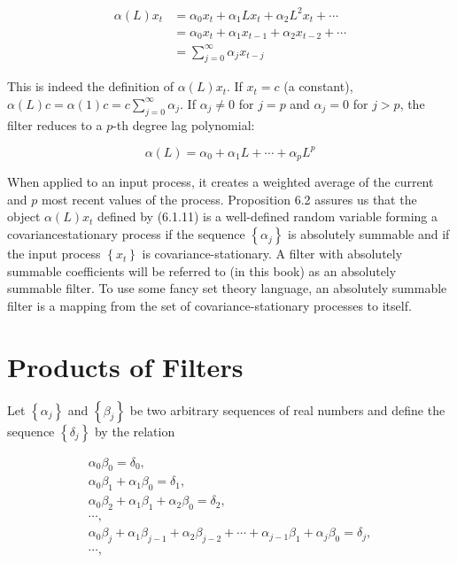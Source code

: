 \documentclass[10pt]{article}
\begin{document}
\begin{align*}
\alpha(L) x_{t} & =\alpha_{0} x_{t}+\alpha_{1} L x_{t}+\alpha_{2} L^{2} x_{t}+\cdots \\
& =\alpha_{0} x_{t}+\alpha_{1} x_{t-1}+\alpha_{2} x_{t-2}+\cdots \\
& =\sum_{j=0}^{\infty} \alpha_{j} x_{t-j} \tag{6.1.11}
\end{align*}


This is indeed the definition of $\alpha(L) x_{t}$. If $x_{t}=c$ (a constant), $\alpha(L) c=\alpha(1) c= c \sum_{j=0}^{\infty} \alpha_{j}$. If $\alpha_{j} \neq 0$ for $j=p$ and $\alpha_{j}=0$ for $j>p$, the filter reduces to a $p$-th degree lag polynomial:

$$
\alpha(L)=\alpha_{0}+\alpha_{1} L+\cdots+\alpha_{p} L^{p}
$$

When applied to an input process, it creates a weighted average of the current and $p$ most recent values of the process. Proposition 6.2 assures us that the object $\alpha(L) x_{t}$ defined by (6.1.11) is a well-defined random variable forming a covariancestationary process if the sequence $\left\{\alpha_{j}\right\}$ is absolutely summable and if the input process $\left\{x_{t}\right\}$ is covariance-stationary. A filter with absolutely summable coefficients will be referred to (in this book) as an absolutely summable filter. To use some fancy set theory language, an absolutely summable filter is a mapping from the set of covariance-stationary processes to itself.

\section*{Products of Filters}
Let $\left\{\alpha_{j}\right\}$ and $\left\{\beta_{j}\right\}$ be two arbitrary sequences of real numbers and define the sequence $\left\{\delta_{j}\right\}$ by the relation


\begin{gather*}
\alpha_{0} \beta_{0}=\delta_{0}, \\
\alpha_{0} \beta_{1}+\alpha_{1} \beta_{0}=\delta_{1}, \\
\alpha_{0} \beta_{2}+\alpha_{1} \beta_{1}+\alpha_{2} \beta_{0}=\delta_{2}, \\
\cdots, \\
\alpha_{0} \beta_{j}+\alpha_{1} \beta_{j-1}+\alpha_{2} \beta_{j-2}+\cdots+\alpha_{j-1} \beta_{1}+\alpha_{j} \beta_{0}=\delta_{j}, \\
\cdots, \tag{6.1.12}
\end{gather*}
\end{document}
